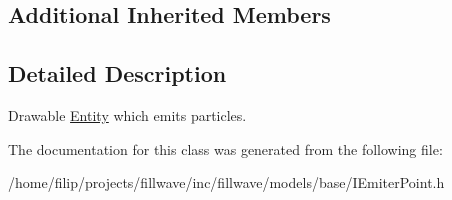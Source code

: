 \subsection*{Additional Inherited Members}


\subsection{Detailed Description}
Drawable \hyperlink{classflw_1_1flf_1_1Entity}{Entity} which emits particles. 

The documentation for this class was generated from the following file\+:\begin{DoxyCompactItemize}
\item 
/home/filip/projects/fillwave/inc/fillwave/models/base/I\+Emiter\+Point.\+h\end{DoxyCompactItemize}
